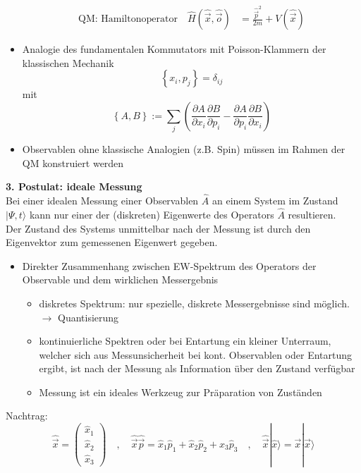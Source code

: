 \documentclass[10pt,article,colorback,accentcolor=tud9d]{scrartcl}
\begin{document}
\begin{itemize}
\begin{equation}
\begin{aligned}
          \text{QM: Hamiltonoperator} \quad \hat{H}(\hat{\vec{x}},\hat{\vec{o}})&=\frac{\hat{\vec{p}}^2}{2m}+V(\hat{\vec{x}})
        \end{aligned}
        \end{equation}
      \item Analogie des fundamentalen Kommutators mit Poisson-Klammern der klassischen Mechanik
        \begin{equation}
         \left\{x_i,p_j\right\}=\delta_{ij}
        \end{equation}
        mit 
        \begin{equation}
        \left\{A,B\right\}:=\sum_j\left(\frac{\partial A}{\partial x_i}\frac{\partial B}{\partial p_i}-\frac{\partial A}{\partial p_i}\frac{\partial B}{\partial x_i}\right)
        \end{equation}
      \item Observablen ohne klassische Analogien (z.B. Spin) müssen im Rahmen der QM konstruiert werden
    \end{itemize}
  \textbf{3. Postulat: ideale Messung}\\
    Bei einer idealen Messung einer Observablen $\hat{A}$ an einem System im Zustand $\left.\right|\Psi,t\rangle$ kann nur einer der (diskreten) Eigenwerte des Operators $\hat{A}$ resultieren.\\
    Der Zustand des Systems unmittelbar nach der Messung ist durch den Eigenvektor zum gemessenen Eigenwert gegeben.
    \begin{itemize}
      \item Direkter Zusammenhang zwischen EW-Spektrum des Operators der Observable und dem wirklichen Messergebnis
        \begin{itemize}
          \item diskretes Spektrum: nur spezielle, diskrete Messergebnisse sind möglich. $\rightarrow$ Quantisierung
          \item kontinuierliche Spektren oder bei Entartung ein kleiner Unterraum, welcher sich aus Messunsicherheit bei kont. Observablen oder Entartung ergibt, ist nach der Messung als Information über den Zustand verfügbar
          \item Messung ist ein ideales Werkzeug zur Präparation von Zuständen
        \end{itemize}
    \end{itemize}
    Nachtrag: 
    \begin{equation}
      \hat{\vec{x}}=\left(\begin{array}{c} \hat{x}_1 \\ \hat{x}_2 \\ \hat{x}_3 \end{array}\right) \quad, \quad \hat{\vec{x}}\hat{\vec{p}}=\hat{x}_1\hat{p}_1 + \hat{x}_2\hat{p}_2 + \hat{x}_3\hat{p}_3 \quad, \quad \hat{\vec{x}}\left.\right|\hat{x}\rangle=\vec{x}\left.\right|\vec{x}\rangle
    \end{equation}
\end{document}
